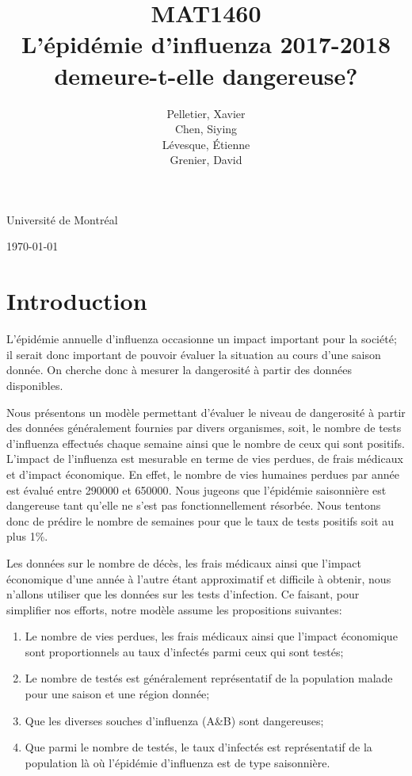\documentclass[12pt]{article}
\title{MAT1460\\[3ex]L'\'epid\'emie d'influenza 2017-2018 demeure-t-elle dangereuse?}
\author{Pelletier, Xavier\\[1ex] Chen, Siying\\[1ex]L\'evesque, \'Etienne\\[1ex] Grenier, David}
\date{}
\begin{document}
    \maketitle
    \thispagestyle{empty}
    \vfill
    \begin{center}
    Universit\'e de Montr\'eal

    \today
    \end{center}
    \clearpage

    \section{Introduction}

L'\'epid\'emie annuelle d'influenza occasionne un impact important pour la soci\'et\'e; il serait
donc important de pouvoir \'evaluer la situation au cours d'une saison donn\'ee. On cherche donc \`a
mesurer la dangerosit\'e \`a partir des donn\'ees disponibles.

Nous pr\'esentons un mod\`ele permettant d'\'evaluer le niveau de dangerosit\'e \`a partir des
donn\'ees g\'en\'eralement fournies par divers organismes\cite{InfluenzaQC}, soit, le nombre de
tests d'influenza effectu\'es chaque semaine ainsi que le nombre de ceux qui sont positifs. L'impact
de l'influenza est mesurable en terme de vies perdues, de frais m\'edicaux et d'impact
\'economique\cite{Impact}. En effet, le nombre de vies humaines perdues par ann\'ee est \'evalu\'e
entre 290000 et 650000\cite{Deces}. Nous jugeons que l'\'epid\'emie saisonni\`ere est dangereuse
tant qu'elle ne s'est pas fonctionnellement r\'esorb\'ee. Nous tentons donc de pr\'edire le nombre
de semaines pour que le taux de tests positifs soit au plus 1\%.

Les donn\'ees sur le nombre de d\'ec\`es, les frais m\'edicaux ainsi que l'impact \'economique d'une
ann\'ee \`a l'autre \'etant approximatif et difficile \`a obtenir, nous n'allons utiliser que les
donn\'ees sur les tests d'infection. Ce faisant, pour simplifier nos efforts, notre mod\`ele assume
les propositions suivantes:

\begin{enumerate}
    \item Le nombre de vies perdues, les frais m\'edicaux ainsi que l'impact \'economique sont proportionnels au taux d'infect\'es parmi ceux qui sont test\'es;
    \item Le nombre de test\'es est g\'en\'eralement repr\'esentatif de la population malade pour une saison et une r\'egion donn\'ee;
    \item Que les diverses souches d'influenza (A\&B) sont dangereuses;
    \item Que parmi le nombre de test\'es, le taux d'infect\'es est repr\'esentatif de la population l\`a o\`u l'\'epid\'emie d'influenza est de type saisonni\`ere.
\end{enumerate}
\clearpage
\end{document}
